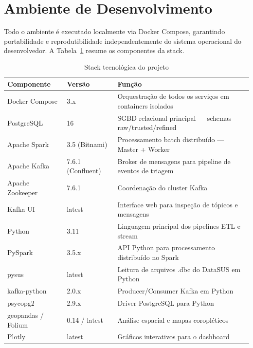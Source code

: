 \documentclass[12pt]{article}
\begin{document}
\section{Ambiente de Desenvolvimento}

Todo o ambiente é executado localmente via Docker Compose, garantindo
portabilidade e reprodutibilidade independentemente do sistema operacional
do desenvolvedor. A Tabela~\ref{tab:stack} resume os componentes da stack.

\begin{table}[ht]
\centering
\caption{Stack tecnológica do projeto}
\label{tab:stack}
\begin{tabularx}{\textwidth}{llX}
\toprule
\textbf{Componente} & \textbf{Versão} & \textbf{Função} \\
\midrule
Docker Compose      & 3.x             & Orquestração de todos os serviços em containers isolados \\
PostgreSQL          & 16              & SGBD relacional principal — schemas raw/trusted/refined \\
Apache Spark        & 3.5 (Bitnami)   & Processamento batch distribuído — Master + Worker \\
Apache Kafka        & 7.6.1 (Confluent)& Broker de mensagens para pipeline de eventos de triagem \\
Apache Zookeeper    & 7.6.1           & Coordenação do cluster Kafka \\
Kafka UI            & latest          & Interface web para inspeção de tópicos e mensagens \\
Python              & 3.11            & Linguagem principal dos pipelines ETL e stream \\
PySpark             & 3.5.x           & API Python para processamento distribuído no Spark \\
pysus               & latest          & Leitura de arquivos .dbc do DataSUS em Python \\
kafka-python        & 2.0.x           & Producer/Consumer Kafka em Python \\
psycopg2            & 2.9.x           & Driver PostgreSQL para Python \\
geopandas / Folium  & 0.14 / latest   & Análise espacial e mapas coropléticos \\
Plotly              & latest          & Gráficos interativos para o dashboard \\
\bottomrule
\end{tabularx}
\end{table}
\end{document}
